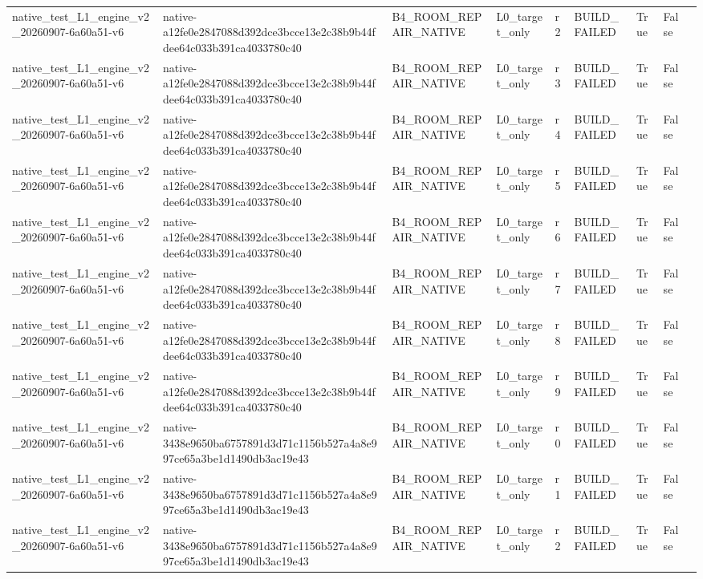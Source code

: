 \begin{tabular}{lllllllll}
native\_test\_L1\_engine\_v2\_20260907-6a60a51-v6 & native-a12fe0e2847088d392dce3bcce13e2c38b9b44fdee64c033b391ca4033780c40 & B4\_ROOM\_REPAIR\_NATIVE & L0\_target\_only & r2 & BUILD\_FAILED & True & False &  \\
native\_test\_L1\_engine\_v2\_20260907-6a60a51-v6 & native-a12fe0e2847088d392dce3bcce13e2c38b9b44fdee64c033b391ca4033780c40 & B4\_ROOM\_REPAIR\_NATIVE & L0\_target\_only & r3 & BUILD\_FAILED & True & False &  \\
native\_test\_L1\_engine\_v2\_20260907-6a60a51-v6 & native-a12fe0e2847088d392dce3bcce13e2c38b9b44fdee64c033b391ca4033780c40 & B4\_ROOM\_REPAIR\_NATIVE & L0\_target\_only & r4 & BUILD\_FAILED & True & False &  \\
native\_test\_L1\_engine\_v2\_20260907-6a60a51-v6 & native-a12fe0e2847088d392dce3bcce13e2c38b9b44fdee64c033b391ca4033780c40 & B4\_ROOM\_REPAIR\_NATIVE & L0\_target\_only & r5 & BUILD\_FAILED & True & False &  \\
native\_test\_L1\_engine\_v2\_20260907-6a60a51-v6 & native-a12fe0e2847088d392dce3bcce13e2c38b9b44fdee64c033b391ca4033780c40 & B4\_ROOM\_REPAIR\_NATIVE & L0\_target\_only & r6 & BUILD\_FAILED & True & False &  \\
native\_test\_L1\_engine\_v2\_20260907-6a60a51-v6 & native-a12fe0e2847088d392dce3bcce13e2c38b9b44fdee64c033b391ca4033780c40 & B4\_ROOM\_REPAIR\_NATIVE & L0\_target\_only & r7 & BUILD\_FAILED & True & False &  \\
native\_test\_L1\_engine\_v2\_20260907-6a60a51-v6 & native-a12fe0e2847088d392dce3bcce13e2c38b9b44fdee64c033b391ca4033780c40 & B4\_ROOM\_REPAIR\_NATIVE & L0\_target\_only & r8 & BUILD\_FAILED & True & False &  \\
native\_test\_L1\_engine\_v2\_20260907-6a60a51-v6 & native-a12fe0e2847088d392dce3bcce13e2c38b9b44fdee64c033b391ca4033780c40 & B4\_ROOM\_REPAIR\_NATIVE & L0\_target\_only & r9 & BUILD\_FAILED & True & False &  \\
native\_test\_L1\_engine\_v2\_20260907-6a60a51-v6 & native-3438e9650ba6757891d3d71c1156b527a4a8e997ce65a3be1d1490db3ac19e43 & B4\_ROOM\_REPAIR\_NATIVE & L0\_target\_only & r0 & BUILD\_FAILED & True & False &  \\
native\_test\_L1\_engine\_v2\_20260907-6a60a51-v6 & native-3438e9650ba6757891d3d71c1156b527a4a8e997ce65a3be1d1490db3ac19e43 & B4\_ROOM\_REPAIR\_NATIVE & L0\_target\_only & r1 & BUILD\_FAILED & True & False &  \\
native\_test\_L1\_engine\_v2\_20260907-6a60a51-v6 & native-3438e9650ba6757891d3d71c1156b527a4a8e997ce65a3be1d1490db3ac19e43 & B4\_ROOM\_REPAIR\_NATIVE & L0\_target\_only & r2 & BUILD\_FAILED & True & False &  \\

\end{tabular}
